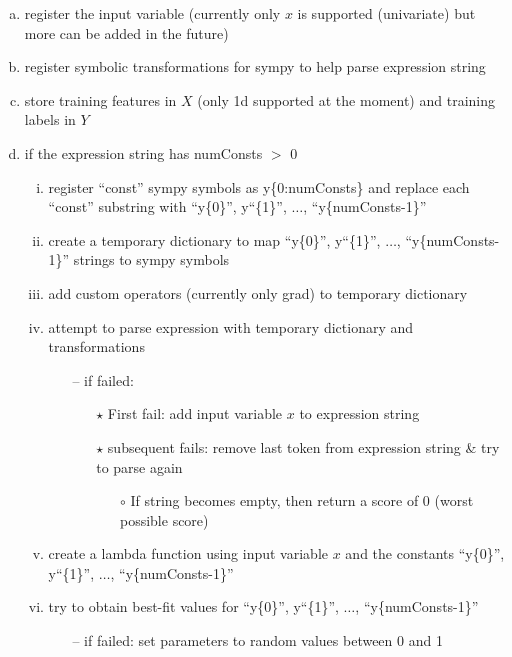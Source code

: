 \documentclass[12pt]{article}
\begin{document}
\begin{redenum}
\begin{enumerate}[A.)]
\begin{enumerate}[I.)]
\begin{enumerate}[i.)]
\begin{enumerate}[a.)]
\begin{goldenum}
\begin{enumerate}[a.)]
\begin{redenumnest}
\begin{enumerate}[a.)]
\begin{magentaenum}
\begin{grassgreenenum}
\begin{purpleenum}
\begin{enumerate}[a.)]
												\item register the input variable (currently only $x$ is supported (univariate) but more can be added in the future)
												\item register symbolic transformations for sympy to help parse expression string
												\item store training features in $X$ (only 1d supported at the moment) and training labels in $Y$
												\item if the expression string has numConsts $>$ 0
												\begin{enumerate}[i.)]
													\item register ``const'' sympy symbols as  y\{0:numConsts\} and replace each ``const'' substring with ``y\{0\}'', y``\{1\}'', $\ldots$, ``y\{numConsts-1\}''
													\item create a temporary dictionary to map ``y\{0\}'', y``\{1\}'', $\ldots$, ``y\{numConsts-1\}'' strings to sympy symbols
													\item add custom operators (currently only grad) to temporary dictionary
													\item attempt to parse expression with temporary dictionary and transformations
													\begin{itemize}
														\item[--] if failed:
														\begin{itemize}
															\item[$\star$] First fail: add input variable $x$ to expression string
															\item[$\star$] subsequent fails: remove last token from expression string \& try to parse again
															\begin{itemize}
																\item[$\circ$] If string becomes empty, then return a score of 0 (worst possible score)
															\end{itemize}
														\end{itemize}
													\end{itemize}
													\item create a lambda function using input variable $x$ and the constants ``y\{0\}'', y``\{1\}'', $\ldots$, ``y\{numConsts-1\}''
													\item try to obtain best-fit values for ``y\{0\}'', y``\{1\}'', $\ldots$, ``y\{numConsts-1\}''
													\begin{itemize}
														\item[--] if failed: set parameters to random values between 0 and 1

\end{itemize}
\end{enumerate}
\end{enumerate}
\end{purpleenum}
\end{grassgreenenum}
\end{magentaenum}
\end{enumerate}
\end{redenumnest}
\end{enumerate}
\end{goldenum}
\end{enumerate}
\end{enumerate}
\end{enumerate}
\end{enumerate}
\end{redenum}
\end{document}

